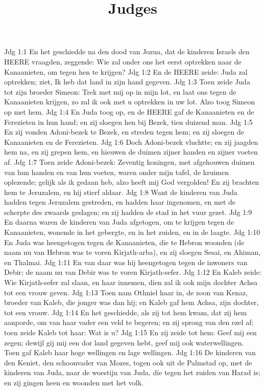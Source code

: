 

\title{Judges}


Jdg 1:1  En het geschiedde na den dood van Jozua, dat de kinderen Israels den HEERE vraagden, zeggende: Wie zal onder ons het eerst optrekken naar de Kanaanieten, om tegen hen te krijgen?
Jdg 1:2  En de HEERE zeide: Juda zal optrekken; ziet, Ik heb dat land in zijn hand gegeven.
Jdg 1:3  Toen zeide Juda tot zijn broeder Simeon: Trek met mij op in mijn lot, en laat ons tegen de Kanaanieten krijgen, zo zal ik ook met u optrekken in uw lot. Alzo toog Simeon op met hem.
Jdg 1:4  En Juda toog op, en de HEERE gaf de Kanaanieten en de Ferezieten in hun hand; en zij sloegen hen bij Bezek, tien duizend man.
Jdg 1:5  En zij vonden Adoni-bezek te Bezek, en streden tegen hem; en zij sloegen de Kanaanieten en de Ferezieten.
Jdg 1:6  Doch Adoni-bezek vluchtte; en zij jaagden hem na, en zij grepen hem, en hieuwen de duimen zijner handen en zijner voeten af.
Jdg 1:7  Toen zeide Adoni-bezek: Zeventig koningen, met afgehouwen duimen van hun handen en van hun voeten, waren onder mijn tafel, de kruimen oplezende; gelijk als ik gedaan heb, alzo heeft mij God vergolden! En zij brachten hem te Jeruzalem, en hij stierf aldaar.
Jdg 1:8  Want de kinderen van Juda hadden tegen Jeruzalem gestreden, en hadden haar ingenomen, en met de scherpte des zwaards geslagen; en zij hadden de stad in het vuur gezet.
Jdg 1:9  En daarna waren de kinderen van Juda afgetogen, om te krijgen tegen de Kanaanieten, wonende in het gebergte, en in het zuiden, en in de laagte.
Jdg 1:10  En Juda was heengetogen tegen de Kanaanieten, die te Hebron woonden (de naam nu van Hebron was te voren Kirjath-arba), en zij sloegen Sesai, en Ahiman, en Thalmai.
Jdg 1:11  En van daar was hij heengetogen tegen de inwoners van Debir; de naam nu van Debir was te voren Kirjath-sefer.
Jdg 1:12  En Kaleb zeide: Wie Kirjath-sefer zal slaan, en haar innemen, dien zal ik ook mijn dochter Achsa tot een vrouw geven.
Jdg 1:13  Toen nam Othniel haar in, de zoon van Kenaz, broeder van Kaleb, die jonger was dan hij; en Kaleb gaf hem Achsa, zijn dochter, tot een vrouw.
Jdg 1:14  En het geschiedde, als zij tot hem kwam, dat zij hem aanporde, om van haar vader een veld te begeren; en zij sprong van den ezel af; toen zeide Kaleb tot haar: Wat is u?
Jdg 1:15  En zij zeide tot hem: Geef mij een zegen; dewijl gij mij een dor land gegeven hebt, geef mij ook waterwellingen. Toen gaf Kaleb haar hoge wellingen en lage wellingen.
Jdg 1:16  De kinderen van den Keniet, den schoonvader van Mozes, togen ook uit de Palmstad op, met de kinderen van Juda, naar de woestijn van Juda, die tegen het zuiden van Harad is; en zij gingen heen en woonden met het volk.
